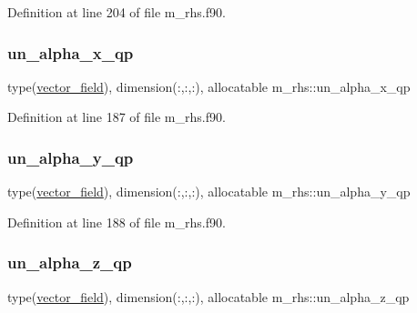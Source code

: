 Definition at line 204 of file m\+\_\+rhs.\+f90.

\mbox{\label{namespacem__rhs_a7b00376acfcaf5c7628428725986f223}} 
\subsubsection{\texorpdfstring{un\+\_\+alpha\+\_\+x\+\_\+qp}{un\_alpha\_x\_qp}}
{\footnotesize\ttfamily type(\hyperlink{structm__derived__types_1_1vector__field}{vector\+\_\+field}), dimension(\+:,\+:,\+:), allocatable m\+\_\+rhs\+::un\+\_\+alpha\+\_\+x\+\_\+qp}



Definition at line 187 of file m\+\_\+rhs.\+f90.

\mbox{\label{namespacem__rhs_a2b0b138349cb9c896cb7985bdcedafe1}} 
\subsubsection{\texorpdfstring{un\+\_\+alpha\+\_\+y\+\_\+qp}{un\_alpha\_y\_qp}}
{\footnotesize\ttfamily type(\hyperlink{structm__derived__types_1_1vector__field}{vector\+\_\+field}), dimension(\+:,\+:,\+:), allocatable m\+\_\+rhs\+::un\+\_\+alpha\+\_\+y\+\_\+qp}



Definition at line 188 of file m\+\_\+rhs.\+f90.

\mbox{\label{namespacem__rhs_aa0d0342fdf7c5d5f795c151fc10d1cee}} 
\subsubsection{\texorpdfstring{un\+\_\+alpha\+\_\+z\+\_\+qp}{un\_alpha\_z\_qp}}
{\footnotesize\ttfamily type(\hyperlink{structm__derived__types_1_1vector__field}{vector\+\_\+field}), dimension(\+:,\+:,\+:), allocatable m\+\_\+rhs\+::un\+\_\+alpha\+\_\+z\+\_\+qp}



